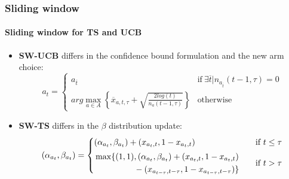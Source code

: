 
\begin{frame}
\frametitle{Sliding window}
\framesubtitle{Sliding window for TS and UCB}

\begin{itemize}[leftmargin=*, label={$\circ$}]
    \item \textbf{SW-UCB} differs in the confidence bound formulation and the new arm choice:
        \begin{displaymath}
            a_t =
            \begin{cases}
                a_{\overline{t}} & \text{if} ~ \exists \overline{t} \vert n_{a_{\overline{t}}}(t-1, \tau) = 0 \\
                arg\max\limits_{a \in A} \left\{ \overline{x}_{a, t, \tau} + \sqrt{\frac{2log(t)}{n_a(t-1, \tau)}} \right\} & \text{otherwise}
            \end{cases}
        \end{displaymath}
    \item \textbf{SW-TS} differs in the $\beta$ distribution update:
        \begin{displaymath}
            \displayindent0pt \displaywidth\textwidth
            (\alpha_{a_t}, \beta_{a_t}) =
            \begin{cases}
                (\alpha_{a_t}, \beta_{a_t}) + (x_{a_t, t}, 1-x_{a_t, t}) & \text{if} ~ t \leq \tau \\[1ex]
                \!\begin{aligned}
                    & \max \{ (1, 1)\!\begin{aligned}[t]
                        & , (\alpha_{a_t}, \beta_{a_t}) + (x_{a_t, t}, 1-x_{a_t, t}) \\
                        & - (x_{a_{t-\tau}, t-\tau}, 1-x_{a_{t-\tau}, t-\tau}) \}
                    \!\end{aligned}
                \end{aligned} & \text{if} ~ t > \tau
            \end{cases}
        \end{displaymath}
\end{itemize}

\end{frame}


